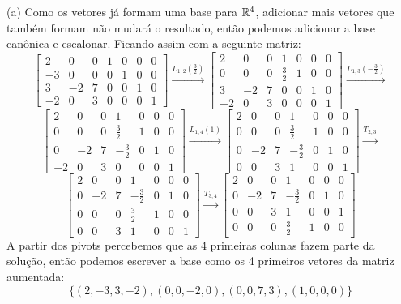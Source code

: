 \documentclass{homework}
\begin{document}
\exercise*
(a) Como os vetores já formam uma base para $\mathbb R^4$, adicionar mais vetores que também formam não mudará o resultado, então podemos adicionar a base canônica e escalonar. Ficando assim com a seguinte matriz:
\[
\begin{bmatrix}
2 & 0 & 0 & 1 & 0 & 0 & 0 \\
-3 & 0 & 0 & 0 & 1 & 0 & 0\\
3 & -2 & 7 & 0 & 0 & 1 & 0\\
-2 & 0 & 3 & 0 & 0 & 0 & 1
\end{bmatrix} \xrightarrow{L_{1,2}(\frac{3}{2})}
\begin{bmatrix}
2 & 0 & 0 & 1 & 0 & 0 & 0 \\
0 & 0 & 0 & \frac{3}{2} & 1 & 0 & 0\\
3 & -2 & 7 & 0 & 0 & 1 & 0\\
-2 & 0 & 3 & 0 & 0 & 0 & 1
\end{bmatrix} \xrightarrow{L_{1,3}(-\frac{3}{2})}
\]
\[
\begin{bmatrix}
2 & 0 & 0 & 1 & 0 & 0 & 0 \\
0 & 0 & 0 & \frac{3}{2} & 1 & 0 & 0\\
0 & -2 & 7 & -\frac{3}{2} & 0 & 1 & 0\\
-2 & 0 & 3 & 0 & 0 & 0 & 1
\end{bmatrix} \xrightarrow{L_{1,4}(1)}
\begin{bmatrix}
2 & 0 & 0 & 1 & 0 & 0 & 0 \\
0 & 0 & 0 & \frac{3}{2} & 1 & 0 & 0\\
0 & -2 & 7 & -\frac{3}{2} & 0 & 1 & 0\\
0 & 0 & 3 & 1 & 0 & 0 & 1
\end{bmatrix} \xrightarrow{T_{2,3}}
\]
\[
\begin{bmatrix}
2 & 0 & 0 & 1 & 0 & 0 & 0 \\
0 & -2 & 7 & -\frac{3}{2} & 0 & 1 & 0\\
0 & 0 & 0 & \frac{3}{2} & 1 & 0 & 0\\
0 & 0 & 3 & 1 & 0 & 0 & 1
\end{bmatrix} \xrightarrow{T_{3,4}}
\begin{bmatrix}
2 & 0 & 0 & 1 & 0 & 0 & 0 \\
0 & -2 & 7 & -\frac{3}{2} & 0 & 1 & 0\\
0 & 0 & 3 & 1 & 0 & 0 & 1\\
0 & 0 & 0 & \frac{3}{2} & 1 & 0 & 0
\end{bmatrix}
\]
A partir dos pivots percebemos que as 4 primeiras colunas fazem parte da solução, então podemos escrever a base como os 4 primeiros vetores da matriz aumentada:
\[\{(2,-3,3,-2),(0,0,-2,0),(0,0,7,3),(1,0,0,0)\}\]
\end{document}
